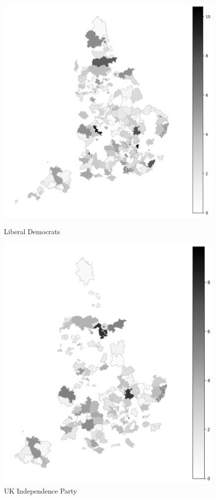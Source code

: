 \documentclass[preprint]{elsarticle} %
\begin{document}
\begin{figure}[htbp]
	\begin{minipage}[t]{0.335\textwidth}
		\centering
		\includegraphics[width=\textwidth,height=0.68\textheight,keepaspectratio]{plots/LiberalDemocrats_2010GeneralElection_Environmental_Mentions.png}
		\caption{Liberal Democrats}
	\end{minipage}\hfill
	\begin{minipage}[t]{0.335\textwidth}
		\centering
		\includegraphics[width=\textwidth,height=0.68\textheight,keepaspectratio]{plots/UKIndependenceParty_2010GeneralElection_Environmental_Mentions.png}
		\caption{UK Independence Party}
	\end{minipage}
	

\end{figure}
\end{document}
